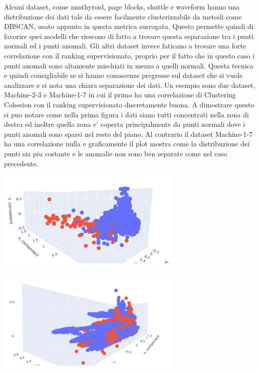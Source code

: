 Alcuni dataset, come annthyroid, page blocks, shuttle e waveform hanno una distribuzione dei dati tale da essere facilmente clusterizzabile da metodi come DBSCAN, usato appunto in questa metrica surrogata. Questo permette quindi di favorire quei modelli che riescono di fatto a trovare questa separazione tra i punti normali ed i punti anomali.
Gli altri dataset invece faticano a trovare una forte correlazione con il ranking supervisionato, proprio per il fatto che in questo caso i punti anomali sono altamente mischiati in mezzo a quelli normali.
Questa tecnica e quindi consigliabile se si hanno conoscenze pregresse sul dataset che si vuole analizzare e si nota una chiara separazione dei dati. Un esempio sono due dataset, Machine-2-3 e Machine-1-7 in cui il primo ha una correlazione di Clustering Cohesion con il ranking supervisionato discretamente buona. A dimostrare questo si puo notare come nella prima figura i dati siano tutti concentrati nella zona di destra ed inoltre quella zona e' coperta principalmente da punti normali dove i punti anomali sono sparsi nel resto del piano. 
Al contrario il dataset Machine-1-7 ha una correlazione nulla e graficamente il plot mostra come la distribuzione dei punti sia piu costante e le anomalie non sono ben separate come nel caso precedente. 
\begin{center}
	\includegraphics[width=9cm, scale=1]{images/scatter_cluster_good}
    \captionsetup{type=figure}
\end{center}
\begin{center}
	\includegraphics[width=9cm, scale=1]{images/scatter_cluster}
    \captionsetup{type=figure}
\end{center}

